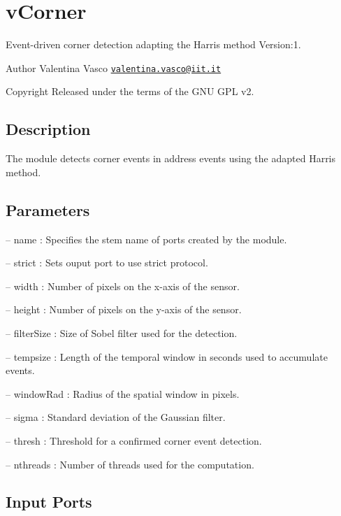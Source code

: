 \hypertarget{group__vCorner}{}\section{v\+Corner}
\label{group__vCorner}
Event-\/driven corner detection adapting the Harris method Version\+:1. \begin{DoxyAuthor}{Author}
Valentina Vasco \href{mailto:valentina.vasco@iit.it}{\tt valentina.\+vasco@iit.\+it} ~\newline
 
\end{DoxyAuthor}
\begin{DoxyCopyright}{Copyright}
Released under the terms of the G\+NU G\+PL v2. 
\end{DoxyCopyright}
\hypertarget{group__zynqGrabber_intro_sec}{}\subsection{Description}\label{group__zynqGrabber_intro_sec}
The module detects corner events in address events using the adapted Harris method.\hypertarget{group__zynqGrabber_parameters_sec}{}\subsection{Parameters}\label{group__zynqGrabber_parameters_sec}

\begin{DoxyItemize}
\item -- name \+: Specifies the stem name of ports created by the module.
\item -- strict \+: Sets ouput port to use strict protocol.
\item -- width \+: Number of pixels on the x-\/axis of the sensor.
\item -- height \+: Number of pixels on the y-\/axis of the sensor.
\item -- filter\+Size \+: Size of Sobel filter used for the detection.
\item -- tempsize \+: Length of the temporal window in seconds used to accumulate events.
\item -- window\+Rad \+: Radius of the spatial window in pixels.
\item -- sigma \+: Standard deviation of the Gaussian filter.
\item -- thresh \+: Threshold for a confirmed corner event detection.
\item -- nthreads \+: Number of threads used for the computation. 
\end{DoxyItemize}\hypertarget{group__zynqGrabber_inputports_sec}{}\subsection{Input Ports}\label{group__zynqGrabber_inputports_sec}

